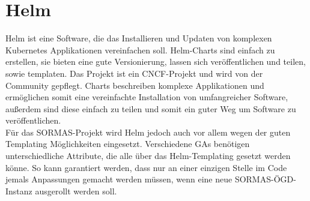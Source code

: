 \section{Helm}
Helm ist eine Software, die das Installieren und Updaten von komplexen Kubernetes Applikationen vereinfachen soll.
Helm-Charts sind einfach zu erstellen, sie bieten eine gute Versionierung, lassen sich veröffentlichen und teilen, sowie templaten.
Das Projekt ist ein \ac{CNCF}-Projekt und wird von der Community gepflegt.
Charts beschreiben komplexe Applikationen und ermöglichen somit eine vereinfachte Installation von umfangreicher Software, außerdem sind diese einfach zu teilen und somit ein guter Weg um Software zu veröffentlichen.
\cite{helm}
\\
Für das \ac{SORMAS}-Projekt wird Helm jedoch auch vor allem wegen der guten Templating Möglichkeiten eingesetzt.
Verschiedene \ac{GAs} benötigen unterschiedliche Attribute, die alle über das Helm-Templating gesetzt werden könne.
So kann garantiert werden, dass nur an einer einzigen Stelle im Code jemals Anpassungen gemacht werden müssen, wenn eine neue \ac{SORMAS-ÖGD}-Instanz ausgerollt werden soll.